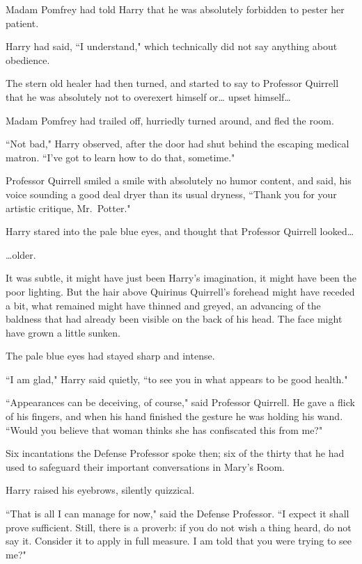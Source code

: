 Madam Pomfrey had told Harry that he was absolutely forbidden to pester her patient.

Harry had said, ``I understand," which technically did not say anything about obedience.

The stern old healer had then turned, and started to say to Professor Quirrell that he was absolutely not to overexert himself or{\ldots} upset himself{\ldots}

Madam Pomfrey had trailed off, hurriedly turned around, and fled the room.

``Not bad," Harry observed, after the door had shut behind the escaping medical matron. ``I've got to learn how to do that, sometime."

Professor Quirrell smiled a smile with absolutely no humor content, and said, his voice sounding a good deal dryer than its usual dryness, ``Thank you for your artistic critique, Mr.~Potter."

Harry stared into the pale blue eyes, and thought that Professor Quirrell looked{\ldots}

{\ldots}older.

It was subtle, it might have just been Harry's imagination, it might have been the poor lighting. But the hair above Quirinus Quirrell's forehead might have receded a bit, what remained might have thinned and greyed, an advancing of the baldness that had already been visible on the back of his head. The face might have grown a little sunken.

The pale blue eyes had stayed sharp and intense.

``I am glad," Harry said quietly, ``to see you in what appears to be good health."

``Appearances can be deceiving, of course," said Professor Quirrell. He gave a flick of his fingers, and when his hand finished the gesture he was holding his wand. ``Would you believe that woman thinks she has confiscated this from me?"

Six incantations the Defense Professor spoke then; six of the thirty that he had used to safeguard their important conversations in Mary's Room.

Harry raised his eyebrows, silently quizzical.

``That is all I can manage for now," said the Defense Professor. ``I expect it shall prove sufficient. Still, there is a proverb: if you do not wish a thing heard, do not say it. Consider it to apply in full measure. I am told that you were trying to see me?"

